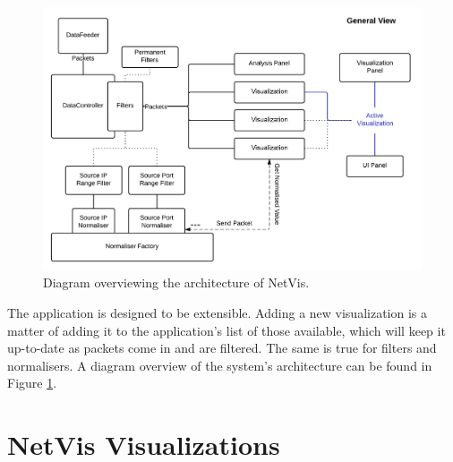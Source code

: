 \begin{figure}[htb]
   \centering
   \includegraphics[width=\linewidth]{materials/architecture.jpg}
   \caption[Architecture]{\label{fig:architecture}
         Diagram overviewing the architecture of NetVis.}
\end{figure}

The application is designed to be extensible. Adding a new visualization is a matter
of adding it to the application's list of those available, which will keep it up-to-date
as packets come in and are filtered. The same is true for filters and normalisers. A diagram
overview of the system's architecture can be found in Figure \ref{fig:architecture}.


\section{NetVis Visualizations} \label{sec:visuals}
%

